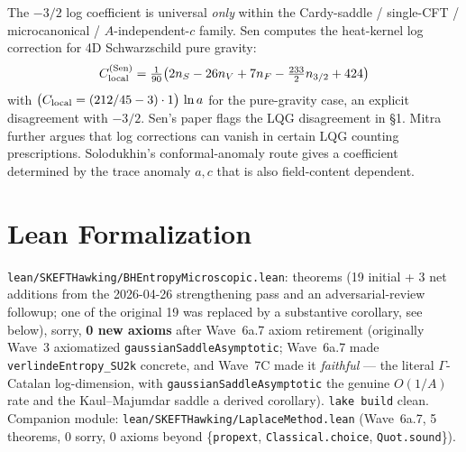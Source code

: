 \documentclass[aps,prd,twocolumn,showpacs,superscriptaddress,nofootinbib]{revtex4-2}
\begin{document}
The $-3/2$ log coefficient is universal \emph{only} within the
Cardy-saddle / single-CFT / microcanonical / $A$-independent-$c$
family. Sen \cite{Sen2013Schwarzschild} computes the heat-kernel
log correction for 4D Schwarzschild pure gravity:
\begin{equation}
C_{\rm local}^{(\rm Sen)} = \tfrac{1}{90}\bigl(2 n_S - 26 n_V + 7 n_F
- \tfrac{233}{2} n_{3/2} + 424\bigr)
\end{equation}
with $\bigl(C_{\rm local} = (212/45 - 3) \cdot 1\bigr)\,\ln a$ for the
pure-gravity case, an explicit disagreement with $-3/2$. Sen's paper
flags the LQG disagreement in \S1. Mitra
\cite{Mitra2014LogVanish} further argues that log corrections can
vanish in certain LQG counting prescriptions. Solodukhin's
conformal-anomaly route \cite{Solodukhin2011LivingRev} gives a
coefficient determined by the trace anomaly $a, c$ that is also
field-content dependent.

\section{Lean Formalization}
\label{sec:lean}

\texttt{lean/SKEFTHawking/BHEntropyMicroscopic.lean}:
\bhEntropyTotal{} theorems
(19 initial + 3 net additions from the 2026-04-26 strengthening pass
and an adversarial-review followup; one of the original 19 was
replaced by a substantive corollary, see below), \sorrycount{} sorry,
\textbf{0 new axioms} after Wave~6a.7 axiom retirement
(originally Wave~3 axiomatized \texttt{gaussianSaddleAsymptotic};
Wave~6a.7 made \texttt{verlindeEntropy\_SU2k} concrete, and Wave~7C made it
\emph{faithful} --- the literal $\Gamma$-Catalan log-dimension, with
\texttt{gaussianSaddleAsymptotic} the genuine $O(1/A)$ rate and the
Kaul--Majumdar saddle a derived corollary). \texttt{lake build}
clean. Companion module:
\texttt{lean/SKEFTHawking/LaplaceMethod.lean} (Wave~6a.7,
5 theorems, 0 sorry, 0 axioms beyond \{\texttt{propext},
\texttt{Classical.choice}, \texttt{Quot.sound}\}).
\end{document}
